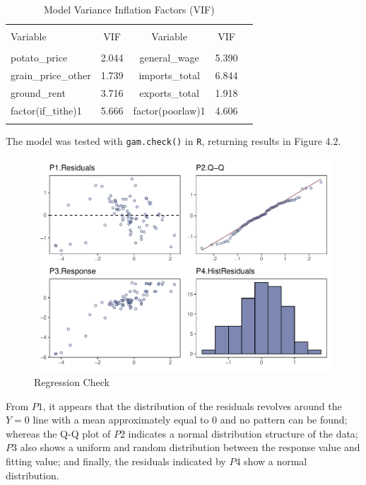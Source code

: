 \begin{table}[h] \centering 
    \caption{Model Variance Inflation Factors (VIF)} 
    \label{vif_table} 
    \begin{tabular}{lcccc} 
    \\[-1.8ex]\hline 
    \hline \\[-1.8ex] 
    Variable & VIF & Variable & VIF \\ 
    \hline \\[-1.8ex] 
    potato\_price & 2.044 & general\_wage & 5.390 \\ 
    grain\_price\_other & 1.739 & imports\_total & 6.844 \\ 
    ground\_rent & 3.716 & exports\_total & 1.918 \\ 
    factor(if\_tithe)1 & 5.666 & factor(poorlaw)1 & 4.606 \\ 
    \hline 
    \hline \\[-1.8ex] 
    \end{tabular} 
\end{table}

The model was tested with \texttt{gam.check()} in \texttt{R}, returning results in Figure 4.2.

\begin{figure}[h]
    \centering
    \caption{Regression Check}
    \includegraphics[width=.9\textwidth]{../03_outputs/regcheck.pdf}
\end{figure}
\vspace{-7pt}

From $P1$, it appears that the distribution of the residuals revolves around the $Y=0$ line with a mean approximately equal to 0 and no pattern can be found; whereas the Q-Q plot of $P2$ indicates a normal distribution structure of the data; $P3$ also shows a uniform and random distribution between the response value and fitting value; and finally, the residuals indicated by $P4$ show a normal distribution.

